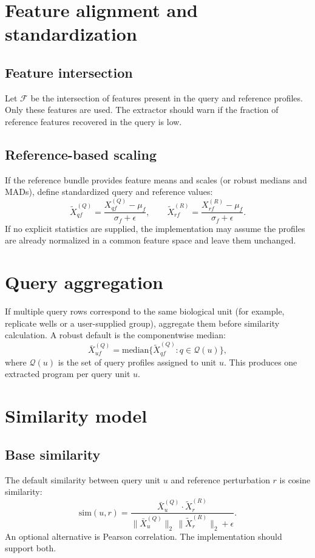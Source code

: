 \documentclass[11pt]{article}
\begin{document}
\section{Feature alignment and standardization}
\subsection{Feature intersection}
Let $\mathcal{F}$ be the intersection of features present in the query and reference profiles. Only these features are used. The extractor should warn if the fraction of reference features recovered in the query is low.

\subsection{Reference-based scaling}
If the reference bundle provides feature means and scales (or robust medians and MADs), define standardized query and reference values:
\[
\tilde{X}^{(Q)}_{qf} = \frac{X^{(Q)}_{qf} - \mu_f}{\sigma_f + \epsilon}, \qquad
\tilde{X}^{(R)}_{rf} = \frac{X^{(R)}_{rf} - \mu_f}{\sigma_f + \epsilon}.
\]
If no explicit statistics are supplied, the implementation may assume the profiles are already normalized in a common feature space and leave them unchanged.

\section{Query aggregation}
If multiple query rows correspond to the same biological unit (for example, replicate wells or a user-supplied group), aggregate them before similarity calculation. A robust default is the componentwise median:
\[
\bar{X}^{(Q)}_{uf} = \mathrm{median}\{ \tilde{X}^{(Q)}_{qf} : q \in \mathcal{Q}(u) \},
\]
where $\mathcal{Q}(u)$ is the set of query profiles assigned to unit $u$.
This produces one extracted program per query unit $u$.

\section{Similarity model}
\subsection{Base similarity}
The default similarity between query unit $u$ and reference perturbation $r$ is cosine similarity:
\[
\mathrm{sim}(u,r) = \frac{\bar{X}^{(Q)}_u \cdot \tilde{X}^{(R)}_r}{\|\bar{X}^{(Q)}_u\|_2 \, \|\tilde{X}^{(R)}_r\|_2 + \epsilon}.
\]
An optional alternative is Pearson correlation. The implementation should support both.
\end{document}

